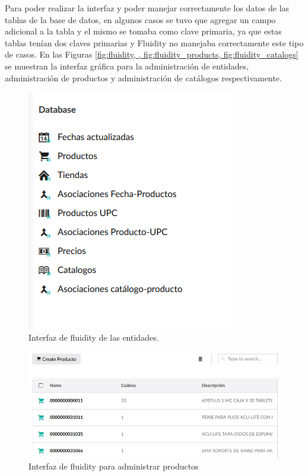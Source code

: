\begin{itemize}
  Para poder realizar la interfaz y poder manejar correctamente los datos de las tablas de la base de datos, en algunos casos se tuvo que agregar un campo adicional a la tabla y el mismo se tomaba como clave primaria, ya que estas tablas tenían dos claves primarias y Fluidity no manejaba correctamente este tipo de casos. En las Figuras \ref{fig:fluidity, , fig:fluidity_products, fig:fluidity_catalogs} se muestran la interfaz gráfica para la administración de entidades, administración de productos y administración de catálogos respectivamente.
  \begin{figure}[H]
    \begin{center}
    \includegraphics[scale=0.7]{fluidity.png}
    \caption{Interfaz de fluidity de las entidades.}
    \label{fig:fluidity}
    \end{center}
    \end{figure}
    
    \begin{figure}[H]
      \begin{center}
      \includegraphics[scale=0.7 ]{productos_fluidity.png}
      \caption{Interfaz de fluidity para administrar productos}
      \label{fig:fluidity_products}
      \end{center}
      \end{figure}



\end{itemize}
